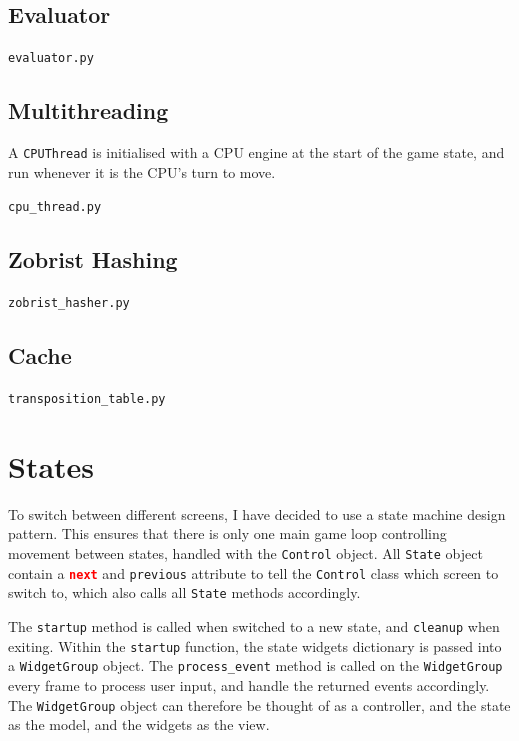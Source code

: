 \documentclass[../main/main.tex]{subfiles}
\begin{document}
\subsection{Evaluator}
\noindent\verb|evaluator.py|


\subsection{Multithreading}
A \lstinline{CPUThread} is initialised with a CPU engine at the start of the game state, and run whenever it is the CPU's turn to move.

\noindent\verb|cpu_thread.py|
\label{sec:cpu-thread}


\subsection{Zobrist Hashing}
\label{sec:zobrist-hashing}
\noindent\verb|zobrist_hasher.py|


\subsection{Cache}
\noindent\verb|transposition_table.py|


\section{States}
To switch between different screens, I have decided to use a state machine design pattern. This ensures that there is only one main game loop controlling movement between states, handled with the \lstinline{Control} object. All \lstinline{State} object contain a \lstinline[language=json]{next} and \lstinline{previous} attribute to tell the \lstinline{Control} class which screen to switch to, which also calls all \lstinline{State} methods accordingly.

The \lstinline{startup} method is called when switched to a new state, and \lstinline{cleanup} when exiting. Within the \lstinline{startup} function, the state widgets dictionary is passed into a \lstinline{WidgetGroup} object. The \lstinline{process_event} method is called on the \lstinline{WidgetGroup} every frame to process user input, and handle the returned events accordingly. The \lstinline{WidgetGroup} object can therefore be thought of as a controller, and the state as the model, and the widgets as the view.
\end{document}
